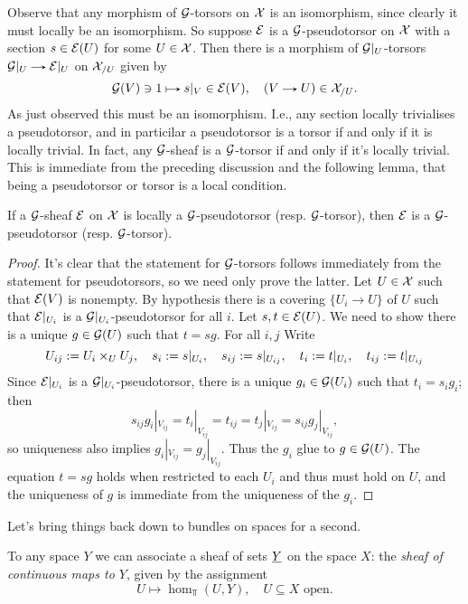 \begin{remarks}
  \label{torsor-equiv}
  Observe that any morphism of $\mathcal{G}$-torsors on $\mathcal{X}$ is an isomorphism,
  since clearly it must locally be an isomorphism. So suppose $\mathcal{E}$ is
  a $\mathcal{G}$-pseudotorsor on $\mathcal{X}$ with a section $s \in \mathcal{E}(U)$ for some $U
  \in \mathcal{X}$. Then there is a morphism of $\mathcal{G}|_U$-torsors $\G|_U \to
  \E|_U$ on $\mathcal{X}_{/U}$ given by
  \[
  \G(V) \ni 1 \mapsto s|_V \in \E(V), \quad (V \to U) \in
  \X_{/U}.
  \]
  As just observed this must be an isomorphism. I.e., any section
  locally trivialises a pseudotorsor, and in particilar a pseudotorsor
  is a torsor if and only if it is locally trivial. In fact, any
  $\mathcal{G}$-sheaf is a $\mathcal{G}$-torsor if and only if it's locally
  trivial. This is immediate from the preceding discussion and the
  following lemma, that being a pseudotorsor or torsor is a local
  condition.
\end{remarks}

\begin{lemma}
  \label{torsor-local}
  If a $\mathcal{G}$-sheaf $\mathcal{E}$ on $\mathcal{X}$ is locally a $\mathcal{G}$-pseudotorsor
  (resp. $\mathcal{G}$-torsor), then $\mathcal{E}$ is a $\mathcal{G}$-pseudotorsor
  (resp. $\mathcal{G}$-torsor).
\end{lemma}

\begin{proof}
  It's clear that the statement for $\mathcal{G}$-torsors follows immediately
  from the statement for pseudotorsors, so we need only prove the
  latter. Let $U \in \mathcal{X}$ such that $\mathcal{E}(V)$ is nonempty. By hypothesis
  there is a covering $\{U_i \to U\}$ of $U$ such that $\mathcal{E}|_{U_i}$ is
  a $\mathcal{G}|_{U_i}$-pseudotorsor for all $i$. Let $s, t \in \mathcal{E}(U)$. We
  need to show there is a unique $g \in \mathcal{G}(U)$ such that $t =
  sg$. For all $i,j$ Write
  \[
  U_{ij} \mathrel{:=} U_i \times_U U_j, \quad
  s_i \mathrel{:=} s|_{U_i}, \quad s_{ij} \mathrel{:=} s|_{U_{ij}}, \quad
  t_i \mathrel{:=} t|_{U_i}, \quad t_{ij} \mathrel{:=} t|_{U_{ij}}
  \]
  Since $\mathcal{E}|_{U_i}$ is a $\mathcal{G}|_{U_i}$-pseudotorsor, there is a unique
  $g_i \in \mathcal{G}(U_i)$ such that $t_i = s_ig_i$; then
  \[
  s_{ij}g_i|_{V_{ij}} = t_i|_{V_{ij}} = t_{ij} = t_j|_{V_{ij}} =
  s_{ij}g_j|_{V_{ij}},
  \]
  so uniqueness also implies $g_i|_{V_{ij}} = g_j|_{V_{ij}}$. Thus the
  $g_i$ glue to $g \in \mathcal{G}(U)$. The equation $t = sg$ holds when
  restricted to each $U_i$ and thus must hold on $U$, and the
  uniqueness of $g$ is immediate from the uniqueness of the $g_i$.
\end{proof}

Let's bring things back down to bundles on spaces for a second.

\begin{definition}
  \label{map-sheaf}
  To any space $Y$ we can associate a sheaf of sets $\underline{Y}$ on the
  space $X$: the \emph{sheaf of continuous maps to $Y$}, given by the
  assignment
  \[
  U \mapsto \hom_\Top(U,Y), \quad U \subseteq X \text{ open}.
  \]
\end{definition}

